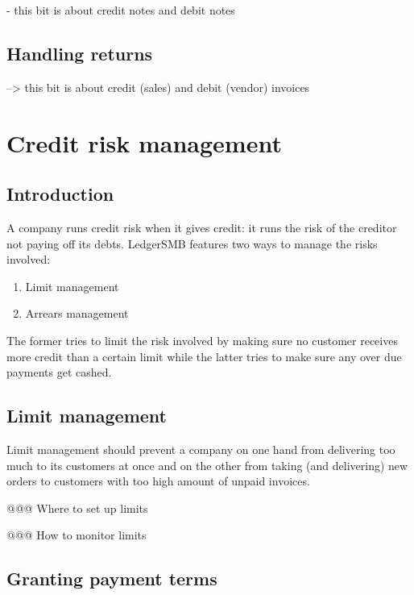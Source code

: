 - this bit is about credit notes and debit notes

\section{Handling returns}
\label{sec-workflows-managing-ar/ap-returns}

--> this bit is about credit (sales) and debit (vendor) invoices

\chapter{Credit risk management}
\label{cha-credit-risk-management}

\section{Introduction}
\label{sec-credit-risk-management-introduction}

A company runs credit risk when it gives credit: it runs the risk of the
creditor not paying off its debts.  LedgerSMB features two ways to manage
the risks involved:

\begin{enumerate}
\item Limit management
\item Arrears management
\end{enumerate}

The former tries to limit the risk involved by making sure no \gls{customer}
receives more credit than a certain limit while the latter tries to
make sure any over due payments get cashed.

\section{Limit management}
\label{sec-workflows-credit-risk-limit-management}

Limit management should prevent a company on one hand from delivering too much
to its customers at once and on the other from taking (and delivering) new orders
to customers with too high amount of unpaid invoices.



@@@ Where to set up limits

@@@ How to monitor limits



\section{Granting payment terms}
\label{sec-workflows-credit-risk-payment-terms}

